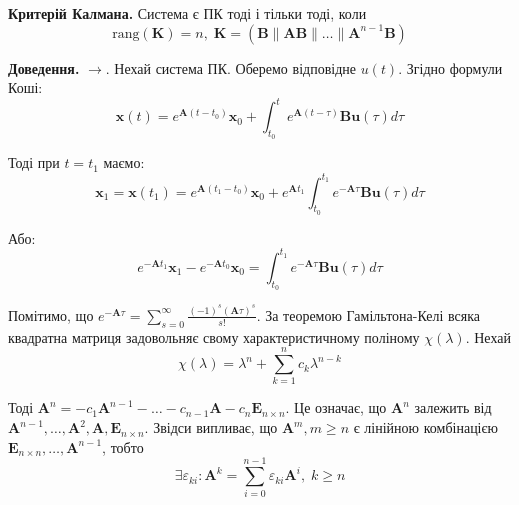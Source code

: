 \documentclass[14pt]{extarticle}
\newcommand{\<}{\langle}
\renewcommand{\>}{\rangle}
\theoremstyle{mystyle}{\newtheorem{definition}{Definition}[section]}
\theoremstyle{mystyle}{\newtheorem{proposition}[definition]{Proposition}}
\theoremstyle{mystyle}{\newtheorem{theorem}[definition]{Theorem}}
\theoremstyle{mystyle}{\newtheorem{lemma}[definition]{Lemma}}
\theoremstyle{mystyle}{\newtheorem{corollary}[definition]{Corollary}}
\theoremstyle{mystyle}{\newtheorem*{remark}{Remark}}
\theoremstyle{mystyle}{\newtheorem*{remarks}{Remarks}}
\theoremstyle{mystyle}{\newtheorem*{example}{Example}}
\theoremstyle{mystyle}{\newtheorem*{examples}{Examples}}
\theoremstyle{definition}{\newtheorem*{exercise}{Exercise}}
\theoremstyle{cstyle}{\newtheorem*{cthm}{}}
\theoremstyle{warn}
\begin{document}
\begin{theorem}
    \textbf{Критерій Калмана.} Система є ПК тоді і тільки тоді, коли
    \begin{equation}
        \text{rang}(\boldsymbol{K}) = n, \; \boldsymbol{K} = (\boldsymbol{B} \parallel \boldsymbol{A}\boldsymbol{B} \parallel \dots \parallel \boldsymbol{A}^{n-1}\boldsymbol{B})
    \end{equation}
\end{theorem}

\textbf{Доведення.} $\to$. Нехай система ПК. Оберемо відповідне $u(t)$. Згідно формули Коші:
\begin{equation}
    \mathbf{x}(t) = e^{\boldsymbol{A}(t-t_0)}\mathbf{x}_0 + \int_{t_0}^t e^{\boldsymbol{A}(t-\tau)}\boldsymbol{B}\mathbf{u}(\tau)d\tau
\end{equation}

Тоді при $t=t_1$ маємо:
\begin{equation}
    \mathbf{x}_1 = \mathbf{x}(t_1) = e^{\boldsymbol{A}(t_1-t_0)}\mathbf{x}_0 + e^{\boldsymbol{A}t_1}\int_{t_0}^{t_1} e^{-\boldsymbol{A}\tau}\boldsymbol{B}\mathbf{u}(\tau)d\tau
\end{equation}

Або:
\begin{equation}
    e^{-\boldsymbol{A}t_1}\mathbf{x}_1 - e^{-\boldsymbol{A}t_0}\mathbf{x}_0 = \int_{t_0}^{t_1}e^{-\boldsymbol{A}\tau}\boldsymbol{B}\mathbf{u}(\tau)d\tau
\end{equation}

Помітимо, що $e^{-\boldsymbol{A}\tau} = \sum_{s=0}^{\infty}\frac{(-1)^s(\boldsymbol{A}\tau)^s}{s!}$. За теоремою Гамільтона-Келі всяка квадратна матриця задовольняє свому характеристичному поліному $\chi(\lambda)$. Нехай
\begin{equation}
    \chi(\lambda) = \lambda^n + \sum_{k=1}^n c_k\lambda^{n-k}
\end{equation}

Тоді $\boldsymbol{A}^n = -c_1\boldsymbol{A}^{n-1}-\dots-c_{n-1}\boldsymbol{A}-c_n\boldsymbol{E}_{n \times n}$. Це означає, що $\boldsymbol{A}^n$ залежить від $\boldsymbol{A}^{n-1},\dots,\boldsymbol{A}^2,\boldsymbol{A},\boldsymbol{E}_{n \times n}$. Звідси випливає, що $\boldsymbol{A}^m,m \geq n$ є лінійною комбінацією $\boldsymbol{E}_{n \times n},\dots,\boldsymbol{A}^{n-1}$, тобто 
\begin{equation}
    \exists \varepsilon_{ki}: \boldsymbol{A}^k = \sum_{i=0}^{n-1}\varepsilon_{ki}\boldsymbol{A}^i, \; k \geq n
\end{equation}
\end{document}
